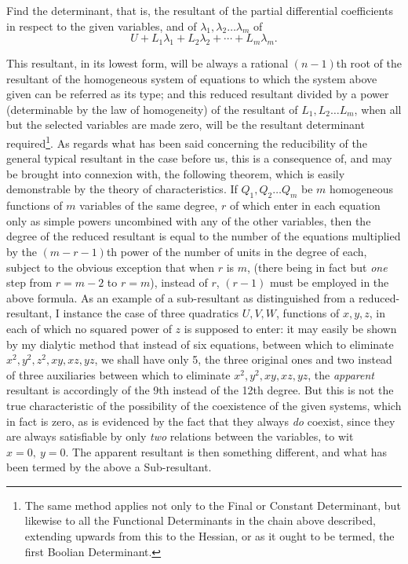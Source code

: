 \documentclass[11pt]{article}
\newcommand{\sourcepage}[1]{\marginpar{\scriptsize p.~#1}}
\begin{document}
{{Find the determinant, that is, the resultant of the partial differential coefficients in respect to the given variables, and of $\lambda_1,\lambda_2\ldots\lambda_m$ of
\[
 U+L_1\lambda_1+L_2\lambda_2+\cdots+L_m\lambda_m.
\]

\sourcepage{189}
This resultant, in its lowest form, will be always a rational $(n-1)$th root of the resultant of the homogeneous system of equations to which the system above given can be referred as its type; and this reduced resultant divided by a power (determinable by the law of homogeneity) of the resultant of $L_1,L_2\ldots L_m$, when all but the selected variables are made zero, will be the resultant determinant required\footnote{The same method applies not only to the Final or Constant Determinant, but likewise to all the Functional Determinants in the chain above described, extending upwards from this to the Hessian, or as it ought to be termed, the first Boolian Determinant.}. As regards what has been said concerning the reducibility of the general typical resultant in the case before us, this is a consequence of, and may be brought into connexion with, the following theorem, which is easily demonstrable by the theory of characteristics. If $Q_1,Q_2\ldots Q_m$ be $m$ homogeneous functions of $m$ variables of the same degree, $r$ of which enter in each equation only as simple powers uncombined with any of the other variables, then the degree of the reduced resultant is equal to the number of the equations multiplied by the $(m-r-1)$th power of the number of units in the degree of each, subject to the obvious exception that when $r$ is $m$, (there being in fact but \emph{one} step from $r=m-2$ to $r=m$), instead of $r$, $(r-1)$ must be employed in the above formula. As an example of a sub-resultant as distinguished from a reduced-resultant, I instance the case of three quadratics $U,V,W$, functions of $x,y,z$, in each of which no squared power of $z$ is supposed to enter: it may easily be shown by my dialytic method that instead of six equations, between which to eliminate $x^2,y^2,z^2,xy,xz,yz$, we shall have only 5, the three original ones and two instead of three auxiliaries between which to eliminate $x^2,y^2,xy,xz,yz$, the \emph{apparent} resultant is accordingly of the 9th instead of the 12th degree. But this is not the true characteristic of the possibility of the coexistence of the given systems, which in fact is zero, as is evidenced by the fact that they always \emph{do} coexist, since they are always satisfiable by only \emph{two} relations between the variables, to wit $x=0,\ y=0$. The apparent resultant is then something different, and what has been termed by the above a Sub-resultant.

}}
\end{document}
